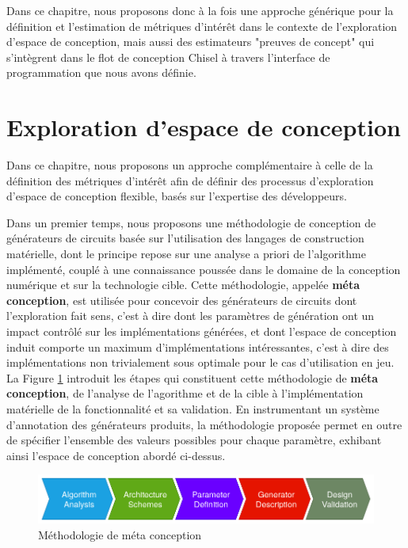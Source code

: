     Dans ce chapitre, nous proposons donc à la fois une approche générique pour la définition et l'estimation de métriques d'intérêt dans le contexte de l'exploration d'espace de conception, mais aussi des estimateurs "preuves de concept" qui s'intègrent dans le flot de conception Chisel à travers l'interface de programmation que nous avons définie.

\vspace{-0.27cm}
\section{Exploration d'espace de conception}
\label{ch.resume:sec.exploration}
\vspace{-0.17cm}
    Dans ce chapitre, nous proposons un approche complémentaire à celle de la définition des métriques d'intérêt afin de définir des processus d'exploration d'espace de conception flexible, basés sur l'expertise des développeurs.

    Dans un premier temps, nous proposons une méthodologie de conception de générateurs de circuits basée sur l'utilisation des langages de construction matérielle, dont le principe repose sur une analyse a priori de l'algorithme implémenté, couplé à une connaissance poussée dans le domaine de la conception numérique et sur la technologie cible.
    Cette méthodologie, appelée {\bf méta conception}, est utilisée pour concevoir des générateurs de circuits dont l'exploration fait sens, c'est à dire dont les paramètres de génération ont un impact contrôlé sur les implémentations générées, et dont l'espace de conception induit comporte un maximum d'implémentations intéressantes, c'est à dire des implémentations non trivialement sous optimale pour le cas d'utilisation en jeu.
    La Figure \ref{ch.resume:sec.exploration:fig.metadesign} introduit les étapes qui constituent cette méthodologie de {\bf méta conception}, de l'analyse de l'agorithme et de la cible à l'implémentation matérielle de la fonctionnalité et sa validation.
    En instrumentant un système d'annotation des générateurs produits, la méthodologie proposée permet en outre de spécifier l'ensemble des valeurs possibles pour chaque paramètre, exhibant ainsi l'espace de conception abordé ci-dessus.

    \begin{figure}[h!]
        \centering
        \includegraphics[width=1.0\textwidth]{Figures/Methodology-metadesign}
        \caption{Méthodologie de méta conception}
        \label{ch.resume:sec.exploration:fig.metadesign}
    \end{figure}

